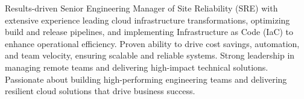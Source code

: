 

\begin{cvparagraph}

Results-driven Senior Engineering Manager of Site Reliability (SRE) with extensive experience leading cloud infrastructure transformations, optimizing build and release pipelines, and implementing Infrastructure as Code (IaC) to enhance operational efficiency. Proven ability to drive cost savings, automation, and team velocity, ensuring scalable and reliable systems. Strong leadership in managing remote teams and delivering high-impact technical solutions. Passionate about building high-performing engineering teams and delivering resilient cloud solutions that drive business success.
\end{cvparagraph}
